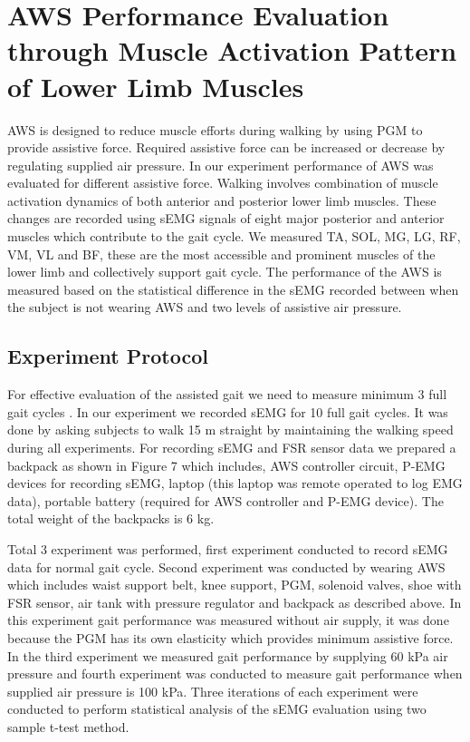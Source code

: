 \documentclass[letterpaper, 10 pt, conference]{ieeeconf}  %
\begin{document}
\section{AWS Performance Evaluation through Muscle Activation Pattern of Lower Limb Muscles} \label{Evaluation}
AWS is designed to reduce muscle efforts during walking by using PGM to provide assistive force. Required assistive force can be increased or decrease by regulating supplied air pressure. In our experiment performance of AWS was evaluated for different assistive force. Walking involves combination of muscle activation dynamics of both anterior and posterior lower limb muscles. These changes are recorded using sEMG signals of eight major posterior and anterior muscles which contribute to the gait cycle. We measured TA, SOL, MG, LG, RF, VM, VL and BF, these are the most accessible and prominent muscles of the lower limb and collectively support gait cycle. The performance of the AWS is measured based on the statistical difference in the sEMG recorded between when the subject is not wearing AWS and two levels of assistive air pressure.

\subsection{Experiment Protocol}
For effective evaluation of the assisted gait we need to measure minimum 3 full gait cycles \cite{10}. In our experiment we recorded sEMG for 10 full gait cycles. It was done by asking subjects to walk 15 m straight by maintaining the walking speed during all experiments. For recording sEMG and FSR sensor data we prepared a backpack as shown in Figure 7 which includes, AWS controller circuit, P-EMG devices for recording sEMG, laptop (this laptop was remote operated to log EMG data), portable battery (required for AWS controller and P-EMG device). The total weight of the backpacks is 6 kg.

Total 3 experiment was performed, first experiment conducted to record sEMG data for normal gait cycle. Second experiment was conducted by wearing AWS which includes waist support belt, knee support, PGM, solenoid valves, shoe with FSR sensor, air tank with pressure regulator and backpack as described above. In this experiment gait performance was measured without air supply, it was done because the PGM has its own elasticity which provides minimum assistive force. In the third experiment we measured gait performance by supplying 60 kPa air pressure and fourth experiment was conducted to measure gait performance when supplied air pressure is 100 kPa. Three iterations of each experiment were conducted to perform statistical analysis of the sEMG evaluation using two sample t-test method.  
\end{document}
